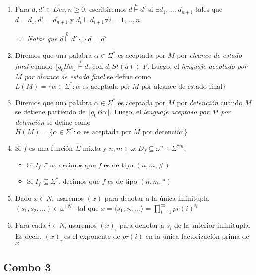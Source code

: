 \documentclass[
]{article}
\providecommand{\tightlist}{%
  \setlength{\itemsep}{0pt}\setlength{\parskip}{0pt}}
\begin{document}
\begin{enumerate}
\def\labelenumi{\arabic{enumi}.}
\tightlist
\item
  Para \(d,d'\in Des,n\geq 0\), escribiremos \(d\overset{n}{\vdash}d'\)
  si \(\exists d_1,...,d_{n+1}\) tales que \(d=d_1,d'=d_{n+1}\) y
  \(d_i\vdash d_{i+1}\forall i=1,...,n\).

  \begin{itemize}
  \tightlist
  \item
    \emph{Notar que \(d\overset{0}{\vdash}d'\Leftrightarrow d=d'\)}
  \end{itemize}
\item
  Diremos que una palabra \(\alpha\in\Sigma^*\) es aceptada por \(M\)
  por \emph{alcance de estado final} cuando
  \(\lfloor q_0B\alpha\rfloor\overset{*}{\vdash}d\), con
  \(d:St(d)\in F\). Luego, el \emph{lenguaje aceptado por \(M\) por
  alcance de estado final} se define como
  \(L(M)=\{\alpha\in\Sigma^*:\alpha\text{ es aceptada por }M\text{ por alcance de estado final}\}\)
\item
  Diremos que una palabra \(\alpha\in\Sigma^*\) es aceptada por \(M\)
  por \emph{detención} cuando \(M\) se detiene partiendo de
  \(\lfloor q_0B\alpha\rfloor\). Luego, el \emph{lenguaje aceptado por
  \(M\) por detención} se define como
  \(H(M)=\{\alpha\in\Sigma^*:\alpha\text{ es aceptada por }M\text{ por detención}\}\)
\item
  Si \(f\) es una función \(\Sigma\)-mixta y
  \(n,m\in\omega:D_f\subseteq\omega^n\times\Sigma^{*m}\),

  \begin{itemize}
  \tightlist
  \item
    Si \(I_f\subseteq\omega\), decimos que \(f\) es de tipo \((n,m,\#)\)
  \item
    Si \(I_f\subseteq\Sigma^*\), decimos que \(f\) es de tipo
    \((n,m,*)\)
  \end{itemize}
\item
  Dado \(x\in N\), usaremos \((x)\) para denotar a la única infinitupla
  \((s_1,s_2,...)\in\omega^{[N]}\) tal que
  \(x=\langle s_1,s_2,...\rangle=\prod_{i=1}^\infty pr(i)^{s_i}\)
\item
  Para cada \(i\in N\), usaremos \((x)_i\) para denotar a \(s_i\) de la
  anterior infinitupla. Es decir, \((x)_i\) es el exponente de \(pr(i)\)
  en la única factorización prima de \(x\)
\end{enumerate}

\subsection{Combo 3}\label{combo-3}
\end{document}

